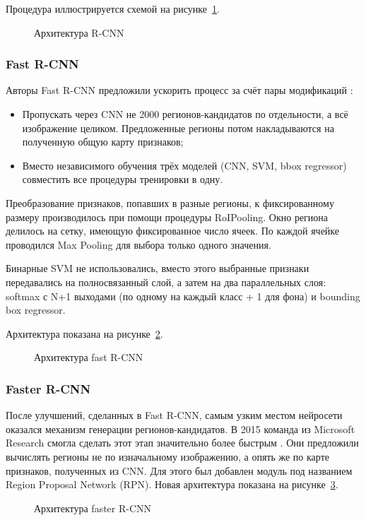 Процедура иллюстрируется схемой на рисунке~\ref{rcnn}.
\begin{figure}[H]
	\caption{Архитектура R-CNN}
	\label{rcnn}
\end{figure}

\subsubsection{Fast R-CNN}
Авторы Fast R-CNN предложили ускорить процесс за счёт пары модификаций \cite{rcnn}:
\begin{itemize}
	\item Пропускать через CNN не 2000 регионов-кандидатов по отдельности, а всё изображение целиком. Предложенные регионы потом накладываются на полученную общую карту признаков;
	\item Вместо независимого обучения трёх моделей (CNN, SVM, bbox regressor) совместить все процедуры тренировки в одну.
\end{itemize}

Преобразование признаков, попавших в разные регионы, к фиксированному размеру производилось при помощи процедуры RoIPooling. Окно региона делилось на сетку, имеющую фиксированное число ячеек.  По каждой ячейке проводился Max Pooling для выбора только одного значения.

Бинарные SVM не использовались, вместо этого выбранные признаки передавались на полносвязанный слой, а затем на два параллельных слоя: softmax с N+1 выходами (по одному на каждый класс + 1 для фона) и bounding box regressor.

Архитектура показана на рисунке~\ref{fastrcnn}.
\begin{figure}[H]
	\caption{Архитектура fast R-CNN}
	\label{fastrcnn}
\end{figure}

\subsubsection{Faster R-CNN}
После улучшений, сделанных в Fast R-CNN, самым узким местом нейросети оказался механизм генерации регионов-кандидатов. В 2015 команда из Microsoft Research смогла сделать этот этап значительно более быстрым \cite{rcnn}. Они предложили вычислять регионы не по изначальному изображению, а опять же по карте признаков, полученных из CNN. Для этого был добавлен модуль под названием Region Proposal Network (RPN). Новая архитектура показана на рисунке~\ref{fasterrcnn}.
\begin{figure}[H]
	\caption{Архитектура faster R-CNN}
	\label{fasterrcnn}
\end{figure}

